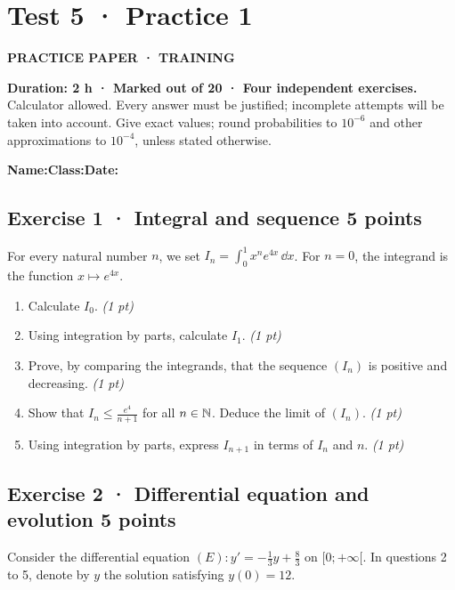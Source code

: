 \clearpage{}\label{sujet:7-1}

\section*{Test 5 · Practice 1}

{\sffamily\bfseries\color{teal}PRACTICE PAPER · TRAINING\par}

\textbf{Duration: 2 h · Marked out of 20 · Four independent exercises.}\\Calculator allowed. Every answer must be justified; incomplete attempts will be taken into account. Give exact values; round probabilities to $10^{-6}$ and other approximations to $10^{-4}$, unless stated otherwise.

\smallskip\textbf{Name:}\enspace\dotfill\quad\textbf{Class:}\enspace\dotfill\quad\textbf{Date:}\enspace\dotfill

\subsection*{Exercise 1 · Integral and sequence \hfill 5 points}For every natural number $n$, we set $I_n=\displaystyle\int_0^1x^ne^{4x}\,\dd x$. For $n=0$, the integrand is the function $x\mapsto e^{4x}$.

\begin{enumerate}

\item Calculate $I_0$. \hfill\textit{(1 pt)}

\item Using integration by parts, calculate $I_1$. \hfill\textit{(1 pt)}

\item Prove, by comparing the integrands, that the sequence $(I_n)$ is positive and decreasing. \hfill\textit{(1 pt)}

\item Show that $I_n\le\frac{e^{4}}{n+1}$ for all $n\in\mathbb N$. Deduce the limit of $(I_n)$. \hfill\textit{(1 pt)}

\item Using integration by parts, express $I_{n+1}$ in terms of $I_n$ and $n$. \hfill\textit{(1 pt)}

\end{enumerate}

\subsection*{Exercise 2 · Differential equation and evolution \hfill 5 points}Consider the differential equation $(E):y'=-\frac1{3}y+\frac{8}{3}$ on $[0;+\infty[$. In questions 2 to 5, denote by $y$ the solution satisfying $y(0)=12$.

